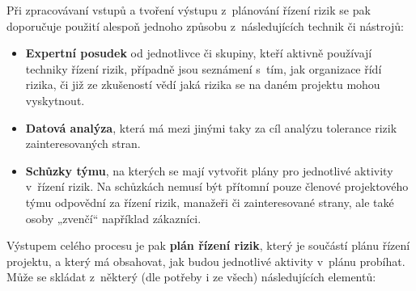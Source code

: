 Při zpracovávaní vstupů a tvoření výstupu z~plánování řízení rizik se pak doporučuje použití alespoň jednoho způsobu z~následujících technik či nástrojů:

\begin{itemize}
    \item \textbf{Expertní posudek} od jednotlivce či skupiny, kteří aktivně používají techniky řízení rizik, případně jsou seznámení s~tím, jak organizace řídí rizika, či již ze zkušeností vědí jaká rizika se na daném projektu mohou vyskytnout. 
    \item \textbf{Datová analýza}, která má mezi jinými taky za cíl analýzu tolerance rizik zainteresovaných stran.
    \item \textbf{Schůzky týmu}, na kterých se mají vytvořit plány pro jednotlivé aktivity v~řízení rizik. Na schůzkách nemusí být přítomní pouze členové projektového týmu odpovědní za řízení rizik, manažeři či zainteresované strany, ale také osoby „zvenčí“ například zákazníci. 
\end{itemize}

Výstupem celého procesu je pak \textbf{plán řízení rizik}, který je součástí plánu řízení projektu, a který má obsahovat, jak budou jednotlivé aktivity v~plánu probíhat.  Může se skládat z~některý (dle potřeby i ze všech) následujících elementů:

